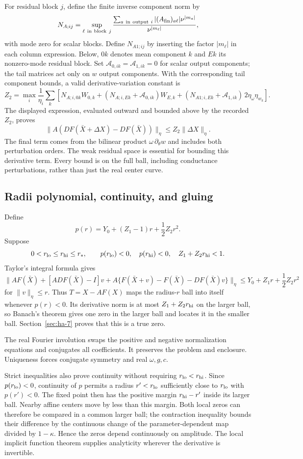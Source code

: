 \documentclass[11pt]{article}
\theoremstyle{definition}
\begin{document}
For residual block $j$, define the finite inverse component norm by
\[
 N_{A;ij}=\sup_{\ell\ {\rm in\ block}\ j}
       \frac{\sum_{a\ {\rm in\ output}\ i}
                    |(A_{\rm fin})_{a\ell}|\nu^{|m_a|}}
            {\nu^{|m_\ell|}},
\]
with mode zero for scalar blocks. Define $N_{A1;ij}$ by inserting the factor $|m_\ell|$ in each column expression. Below, $0k$ denotes mean component $k$ and $Ek$ its nonzero-mode residual block. Set $\mathcal A_{0,ik}=\mathcal A_{1,ik}=0$ for scalar output components; the tail matrices act only on $w$ output components. With the corresponding tail component bounds, a valid derivative-variation constant is
\[
 Z_2=\max_i\frac1{\eta_i}\sum_k\left[
 N_{A;i,0k}W_{0,k}
 +(N_{A;i,Ek}+\mathcal A_{0,ik})W_{E,k}
 +(N_{A1;i,Ek}+\mathcal A_{1,ik})\,2\eta_\omega\eta_{w_k}
 \right].
\]
The displayed expression, evaluated outward and bounded above by the recorded $Z_2$, proves
\[
 \|A(DF(\bar X+\Delta X)-DF(\bar X))\|_\eta
      \le Z_2\|\Delta X\|_\eta.
\]
The final term comes from the bilinear product $\omega\,\partial_\theta w$ and includes both perturbation orders. The weak residual space is essential for bounding this derivative term. Every bound is on the full ball, including conductance perturbations, rather than just the real center curve.

\subsection{Radii polynomial, continuity, and gluing}\label{sec:ha-9}

Define
\[
 p(r)=Y_0+(Z_1-1)r+\frac12Z_2r^2.
\]
Suppose
\[
 0<r_{\rm lo}\le r_{\rm hi}\le r_*,\qquad
 p(r_{\rm lo})<0,\quad p(r_{\rm hi})<0,\quad
 Z_1+Z_2r_{\rm hi}<1.
\]
Taylor's integral formula gives
\[
 \|AF(\bar X)+[ADF(\bar X)-I]v+
 A\{F(\bar X+v)-F(\bar X)-DF(\bar X)v\}\|_\eta
 \le Y_0+Z_1r+\frac12Z_2r^2
\]
for $\|v\|_\eta\le r$. Thus $T=X-AF(X)$ maps the radius-$r$ ball into itself whenever $p(r)<0$. Its derivative norm is at most $Z_1+Z_2r_{\rm hi}$ on the larger ball, so Banach's theorem gives one zero in the larger ball and locates it in the smaller ball. Section~\ref{sec:ha-7} proves that this is a true zero.

The real Fourier involution swaps the positive and negative normalization equations and conjugates all coefficients. It preserves the problem and enclosure. Uniqueness forces conjugate symmetry and real $\omega,g,c$.

Strict inequalities also prove continuity without requiring $r_{\rm lo}<r_{\rm hi}$. Since $p(r_{\rm lo})<0$, continuity of $p$ permits a radius $r'<r_{\rm lo}$ sufficiently close to $r_{\rm lo}$ with $p(r')<0$. The fixed point then has the positive margin $r_{\rm hi}-r'$ inside its larger ball. Nearby affine centers move by less than this margin. Both local zeros can therefore be compared in a common larger ball; the contraction inequality bounds their difference by the continuous change of the parameter-dependent map divided by $1-\kappa$. Hence the zeros depend continuously on amplitude. The local implicit function theorem supplies analyticity wherever the derivative is invertible.
\end{document}
